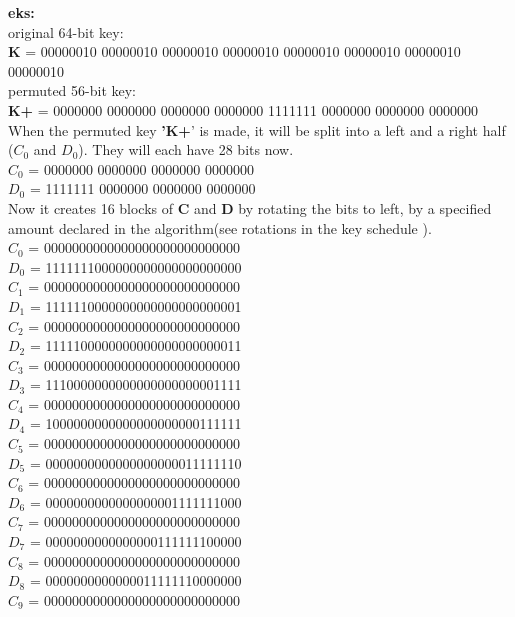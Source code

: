 \textbf{eks:} \\
original 64-bit key:\\
\textbf{K} = 00000010 00000010  00000010  00000010  00000010  00000010  00000010  00000010\\
\bigskip
permuted 56-bit key:\\
\textbf{K+} = 0000000 0000000 0000000 0000000 1111111 0000000 0000000 0000000\\
\bigskip
When the permuted key \textbf{'K+}' is made, it will be split into a left and a right half (\textbf{$C_0$} and \textbf{$D_0$}). They will each have 28 bits now. \cite{des3}\\
\bigskip
$C_0$ = 0000000 0000000 0000000 0000000\\
$D_0$ = 1111111 0000000 0000000 0000000\\
\bigskip
Now it creates 16 blocks of \textbf{C} and \textbf{D} by rotating the bits to left, by a specified amount declared in the algorithm(see rotations in the key schedule \cite{tableWiki}).\\
\bigskip
$C_0$ = 0000000000000000000000000000\\
$D_0$ = 1111111000000000000000000000\\
\bigskip
$C_1$ = 0000000000000000000000000000\\
$D_1$ = 1111110000000000000000000001\\
\bigskip
$C_2$ = 0000000000000000000000000000\\
$D_2$ = 1111100000000000000000000011\\
\bigskip
$C_3$ = 0000000000000000000000000000\\
$D_3$ = 1110000000000000000000001111\\
\bigskip
$C_4$ = 0000000000000000000000000000\\
$D_4$ = 1000000000000000000000111111\\
\bigskip
$C_5$ = 0000000000000000000000000000\\
$D_5$ = 0000000000000000000011111110\\
\bigskip
$C_6$ = 0000000000000000000000000000\\
$D_6$ = 0000000000000000001111111000\\
\bigskip
$C_7$  = 0000000000000000000000000000\\
$D_7$ = 0000000000000000111111100000\\
\bigskip
$C_8$  = 0000000000000000000000000000\\
$D_8$ = 0000000000000011111110000000\\
\bigskip
$C_9$ = 0000000000000000000000000000\\
